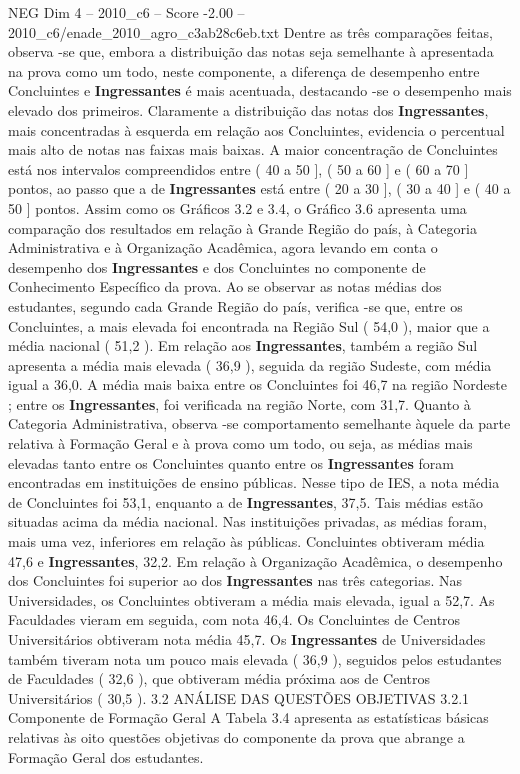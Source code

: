 \begin{textsample}{NEG Dim 4 – 2010\_c6 – Score -2.00 – 2010\_c6/enade\_2010\_agro\_c3ab28c6eb.txt}
Dentre as três comparações feitas, observa -se que, embora a distribuição das notas seja semelhante à apresentada na prova como um todo, neste componente, a diferença de desempenho entre Concluintes e \textbf{Ingressantes} é mais acentuada, destacando -se o desempenho mais elevado dos primeiros.
Claramente a distribuição das notas dos \textbf{Ingressantes}, mais concentradas à esquerda em relação aos Concluintes, evidencia o percentual mais alto de notas nas faixas mais baixas.
A maior concentração de Concluintes está nos intervalos compreendidos entre ( 40 a 50 ], ( 50 a 60 ] e ( 60 a 70 ] pontos, ao passo que a de \textbf{Ingressantes} está entre ( 20 a 30 ], ( 30 a 40 ] e ( 40 a 50 ] pontos.
Assim como os Gráficos 3.2 e 3.4, o Gráfico 3.6 apresenta uma comparação dos resultados em relação à Grande Região do país, à Categoria Administrativa e à Organização Acadêmica, agora levando em conta o desempenho dos \textbf{Ingressantes} e dos Concluintes no componente de Conhecimento Específico da prova.
Ao se observar as notas médias dos estudantes, segundo cada Grande Região do país, verifica -se que, entre os Concluintes, a mais elevada foi encontrada na Região Sul ( 54,0 ), maior que a média nacional ( 51,2 ).
Em relação aos \textbf{Ingressantes}, também a região Sul apresenta a média mais elevada ( 36,9 ), seguida da região Sudeste, com média igual a 36,0.
A média mais baixa entre os Concluintes foi 46,7 na região Nordeste ; entre os \textbf{Ingressantes}, foi verificada na região Norte, com 31,7.
Quanto à Categoria Administrativa, observa -se comportamento semelhante àquele da parte relativa à Formação Geral e à prova como um todo, ou seja, as médias mais elevadas tanto entre os Concluintes quanto entre os \textbf{Ingressantes} foram encontradas em instituições de ensino públicas.
Nesse tipo de IES, a nota média de Concluintes foi 53,1, enquanto a de \textbf{Ingressantes}, 37,5.
Tais médias estão situadas acima da média nacional.
Nas instituições privadas, as médias foram, mais uma vez, inferiores em relação às públicas.
Concluintes obtiveram média 47,6 e \textbf{Ingressantes}, 32,2.
Em relação à Organização Acadêmica, o desempenho dos Concluintes foi superior ao dos \textbf{Ingressantes} nas três categorias.
Nas Universidades, os Concluintes obtiveram a média mais elevada, igual a 52,7.
As Faculdades vieram em seguida, com nota 46,4.
Os Concluintes de Centros Universitários obtiveram nota média 45,7.
Os \textbf{Ingressantes} de Universidades também tiveram nota um pouco mais elevada ( 36,9 ), seguidos pelos estudantes de Faculdades ( 32,6 ), que obtiveram média próxima aos de Centros Universitários ( 30,5 ). 3.2 ANÁLISE DAS QUESTÕES OBJETIVAS 3.2.1 Componente de Formação Geral A Tabela 3.4 apresenta as estatísticas básicas relativas às oito questões objetivas do componente da prova que abrange a Formação Geral dos estudantes.

\end{textsample}
